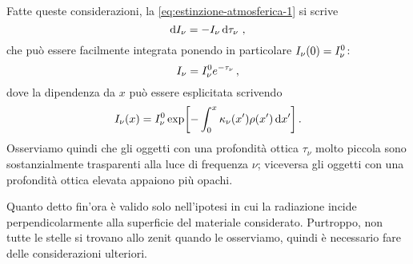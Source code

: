         Fatte queste considerazioni, la \eqref{eq:estinzione-atmosferica-1} si scrive
        \begin{equation}
            \label{eq:estinzione-atmosferica-2}
            \dd{I_\nu} = -I_\nu \dd{\tau_\nu}
            \,,
        \end{equation}
        che può essere facilmente integrata ponendo in particolare $I_\nu\pqty{0} = I_{\nu}^{\text{0}}$:
        \begin{equation}
            I_\nu = I_{\nu}^{\text{0}} e^{-\tau_\nu}
            \,,
        \end{equation}
        dove la dipendenza da $x$ può essere esplicitata scrivendo
        \begin{equation*}
            I_{\nu}\pqty{x} = I_{\nu}^{\text{0}} \exp[-\int_{0}^{x} \kappa_\nu\pqty{x'} \rho\pqty{x'} \dd{x'}]
            \myperiod
        \end{equation*}
        Osserviamo quindi che gli oggetti con una profondità ottica $\tau_\nu$ molto piccola sono sostanzialmente trasparenti alla luce di frequenza $\nu$; viceversa gli oggetti con una profondità ottica elevata appaiono più opachi.
        
        Quanto detto fin'ora è valido solo nell'ipotesi in cui la radiazione incide perpendicolarmente alla superficie del materiale considerato. Purtroppo, non tutte le stelle si trovano allo zenit quando le osserviamo, quindi è necessario fare delle considerazioni ulteriori.